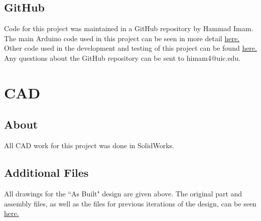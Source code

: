 \documentclass{article}
\begin{document}
\subsection{GitHub}
    Code for this project was maintained in a GitHub repository by Hammad Imam. The main Arduino code used in this project can be seen in more detail \href{https://github.com/himam99/ME250-Proj3/blob/master/Code/me250_proj3_code/me250_proj3_code.ino}{here.} Other code used in the development and testing of this project can be found \href{https://github.com/himam99/ME250-Proj3/tree/master/Code}{here.} Any questions about the GitHub repository can be sent to himam4@uic.edu.
    
\section{CAD}
\subsection{About}

All CAD work for this project was done in SolidWorks.

\subsection{Additional Files}

All drawings for the ``As Built" design are given above. The original part and assembly files, as well as the files for previous iterations of the design, can be seen \href{https://github.com/himam99/ME250-Proj3/tree/master/CAD}{here.}
\end{document}
